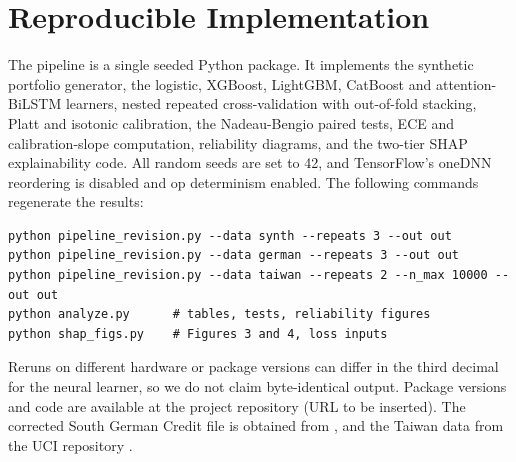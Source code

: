 \documentclass[conference,a4paper]{IEEEtran}
\newcommand{\repourl}{the project repository (URL to be inserted)}
\begin{document}
\section{Reproducible Implementation}
The pipeline is a single seeded Python package. It implements the synthetic portfolio generator, the logistic, XGBoost, LightGBM, CatBoost and attention-BiLSTM learners, nested repeated cross-validation with out-of-fold stacking, Platt and isotonic calibration, the Nadeau-Bengio paired tests, ECE and calibration-slope computation, reliability diagrams, and the two-tier SHAP explainability code. All random seeds are set to 42, and TensorFlow's oneDNN reordering is disabled and op determinism enabled. The following commands regenerate the results:
\begin{lstlisting}
python pipeline_revision.py --data synth --repeats 3 --out out
python pipeline_revision.py --data german --repeats 3 --out out
python pipeline_revision.py --data taiwan --repeats 2 --n_max 10000 --out out
python analyze.py      # tables, tests, reliability figures
python shap_figs.py    # Figures 3 and 4, loss inputs
\end{lstlisting}
Reruns on different hardware or package versions can differ in the third decimal for the neural learner, so we do not claim byte-identical output. Package versions and code are available at \repourl. The corrected South German Credit file is obtained from \cite{r21,r22}, and the Taiwan data from the UCI repository \cite{r31}.
\end{document}
